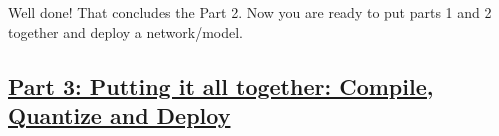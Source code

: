 \documentclass[11pt]{article}
\begin{document}
    Well done! That concludes the Part 2. Now you are ready to put parts 1
and 2 together and deploy a network/model.

\subsection{\texorpdfstring{\href{image_classification_caffe.ipynb}{Part
3: Putting it all together: Compile, Quantize and
Deploy}}{Part 3: Putting it all together: Compile, Quantize and Deploy}}\label{part-3-putting-it-all-together-compile-quantize-and-deploy}


    
    
    
    
\end{document}
